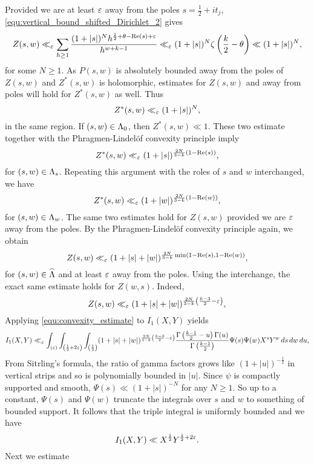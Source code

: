 \documentclass[12pt,reqno,oneside]{amsart}
\begin{document}
  Provided we are at least $\varepsilon$ away from the poles $s = \frac{1}{2}+it_{j}$, \cref{equ:vertical_bound_shifted_Dirichlet_2} gives
  \[
    Z(s,w) \ll_{\varepsilon} \sum_{h \ge 1}\frac{(1+|s|)^{N}h^{\frac{1}{2}+\theta-\mathrm{Re}(s)+\varepsilon}}{h^{w+k-1}} \ll_{\varepsilon} (1+|s|)^{N}\zeta\left(\frac{k}{2}-\theta\right) \ll (1+|s|)^{N},
  \]
  for some $N \ge 1$. As $P(s,w)$ is absolutely bounded away from the poles of $Z(s,w)$ and $Z^{\ast}(s,w)$ is holomorphic, estimates for $Z(s,w)$ and away from poles will hold for $Z^{\ast}(s,w)$ as well. Thus
  \[
    Z^{\ast}(s,w) \ll_{\varepsilon} (1+|s|)^{N},
  \]
  in the same region. If $(s,w) \in \Lambda_{0}$, then $Z^{\ast}(s,w) \ll 1$. These two estimate together with the Phragmen-Lindel\"of convexity principle imply
  \[
    Z^{\ast}(s,w) \ll_{\varepsilon} (1+|s|)^{\frac{2N}{3-k}\left(1-\mathrm{Re}(s)\right)},
  \]
  for $(s,w) \in \Lambda_{s}$. Repeating this argument with the roles of $s$ and $w$ interchanged, we have
  \[
    Z^{\ast}(s,w) \ll_{\varepsilon} (1+|w|)^{\frac{2N}{3-k}\left(1-\mathrm{Re}(w)\right)},
  \]
  for $(s,w) \in \Lambda_{w}$. The same two estimates hold for $Z(s,w)$ provided we are $\varepsilon$ away from the poles. By the Phragmen-Lindel\"of convexity principle again, we obtain
  \begin{equation}\label{equ:convexity_estimate}
    Z(s,w) \ll_{\varepsilon} (1+|s|+|w|)^{\frac{2N}{3-k}\min\left(1-\mathrm{Re}(s),1-\mathrm{Re}(w)\right)},
  \end{equation}
  for $(s,w) \in \widehat{\Lambda}$ and at least $\varepsilon$ away from the poles. Using the interchange, the exact same estimate holds for $Z(w,s)$. Indeed,
  \[
    Z(s,w) \ll_{\varepsilon} (1+|s|+|w|)^{\frac{2N}{3-k}\left(\frac{k-3}{2}-\varepsilon\right)},
  \]
  Applying \cref{equ:convexity_estimate} to $I_{1}(X,Y)$ yields
  \[
    I_{1}(X,Y) \ll_{\varepsilon} \int_{(\varepsilon)}\int_{\left(\frac{1}{2}+2\varepsilon\right)}\int_{\left(\frac{1}{2}\right)}(1+|s|+|w|)^{\frac{2N}{3-k}\left(\frac{k-3}{2}-\varepsilon\right)}\frac{\Gamma\left(\frac{k-1}{2}-u\right)\Gamma(u)}{\Gamma\left(\frac{k-1}{2}\right)}\Psi(s)\Psi(w)X^{s}Y^{w}\,ds\,dw\,du,
  \]
  From Sitrling's formula, the ratio of gamma factors grows like $(1+|u|)^{-\frac{1}{2}}$ in vertical strips and so is polynomially bounded in $|u|$. Since $\psi$ is compactly supported and smooth, $\Psi(s) \ll (1+|s|)^{-N}$ for any $N \ge 1$. So up to a constant, $\Psi(s)$ and $\Psi(w)$ truncate the integrals over $s$ and $w$ to something of bounded support. It follows that the triple integral is uniformly bounded and we have
  \begin{equation}\label{equ:I1_estimate}
    I_{1}(X,Y) \ll X^{\frac{1}{2}}Y^{\frac{1}{2}+2\varepsilon}.
  \end{equation}
  Next we estimate
\end{document}
